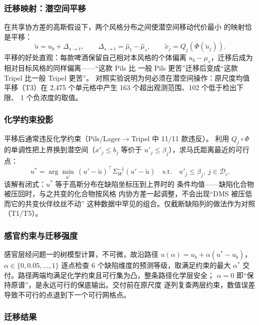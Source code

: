\documentclass[12pt,a4paper]{article}
\begin{document}
\subsubsection{迁移映射：潜空间平移}

在共享协方差的高斯假设下，两个风格分布之间使潜空间移动代价最小
的映射恰是平移：
\begin{equation}
  \tilde u=u_b+\Delta_{s\to t},\qquad \Delta_{s\to t}=\hat\mu_t-\hat\mu_s,
  \qquad \tilde x_j=Q_j(\Phi(\tilde u_j)).
\end{equation}
平移的好处直观：每款啤酒保留自己相对本风格的个体偏离
$u_b-\mu_s$，迁移后成为相对目标风格的同样偏离——``这款 Pils 比
一般 Pils 更苦''迁移后变成``这款 Tripel 比一般 Tripel 更苦''。
对照实验说明为何必须在潜空间操作：原尺度均值平移（T3）在
2{,}475 个单元格中产生 163 个超出观测范围、102 个低于检出下限、
1 个负浓度的取值。

\subsubsection{化学约束投影}

平移后通常违反化学约束（Pils/Lager$\to$Tripel 中 11/11 款违反）。
利用 $Q_j\circ\Phi$ 的单调性把上界换到潜空间（$x'_j\le b_j$
等价于 $u'_j\le\beta_j$），求马氏距离最近的可行点：
\begin{equation}
  u^*=\arg\min_{u'}\,(u'-\tilde u)^\top\Sigma_W^{-1}(u'-\tilde u)
  \quad\text{s.t.}\quad u'_j\le\beta_j,\ j\in\mathcal D_c .
\end{equation}
该解有闭式：$u^*$ 等于高斯分布在缺陷坐标压到上界时的
条件均值——缺陷化合物被压回时，与之共变的化合物按风格
内协方差一起调整，不会出现``DMS 被压低而它的共变伙伴纹丝不动''
这种数据中罕见的组合。仅截断缺陷列的做法作为对照（T1/T5）。

\subsubsection{感官约束与迁移强度}

感官层经问题一的树模型计算，不可微，故沿路径
$u(\alpha)=u_b+\alpha(u^*-u_b)$，$\alpha\in\{0,0.05,\dots,1\}$
逐点检查 6 个缺陷维度的预测等级，取满足约束的最大 $\alpha^*$
交付。路径两端均满足化学约束且可行集为凸，整条路径化学层安全；
$\alpha=0$ 即``保持原谱''，是永远可行的保底输出。交付前在原尺度
逐列复查两层约束，数值误差导致不可行的点退到下一个可行网格点。

\subsubsection{迁移结果}
\end{document}
